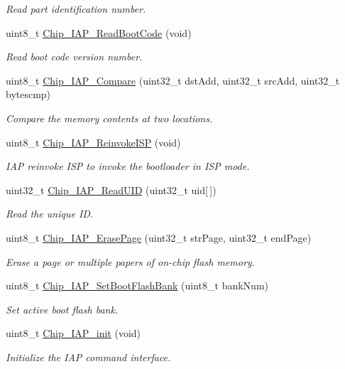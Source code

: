 \begin{DoxyCompactItemize}
\begin{DoxyCompactList}\small\item\em Read part identification number. \end{DoxyCompactList}\item 
uint8\+\_\+t \hyperlink{group___i_a_p__18_x_x__43_x_x_ga478acfa6d97211d4f43edfa8717dc066}{Chip\+\_\+\+I\+A\+P\+\_\+\+Read\+Boot\+Code} (void)
\begin{DoxyCompactList}\small\item\em Read boot code version number. \end{DoxyCompactList}\item 
uint8\+\_\+t \hyperlink{group___i_a_p__18_x_x__43_x_x_ga0f3983319210f99d1931f1e9fa762d9e}{Chip\+\_\+\+I\+A\+P\+\_\+\+Compare} (uint32\+\_\+t dst\+Add, uint32\+\_\+t src\+Add, uint32\+\_\+t bytescmp)
\begin{DoxyCompactList}\small\item\em Compare the memory contents at two locations. \end{DoxyCompactList}\item 
uint8\+\_\+t \hyperlink{group___i_a_p__18_x_x__43_x_x_ga91a6ef5cac3a052f637cf0b5d7d31d53}{Chip\+\_\+\+I\+A\+P\+\_\+\+Reinvoke\+I\+SP} (void)
\begin{DoxyCompactList}\small\item\em I\+AP reinvoke I\+SP to invoke the bootloader in I\+SP mode. \end{DoxyCompactList}\item 
uint32\+\_\+t \hyperlink{group___i_a_p__18_x_x__43_x_x_ga621dd1ce1454b282dcbe56fb905ce4cb}{Chip\+\_\+\+I\+A\+P\+\_\+\+Read\+U\+ID} (uint32\+\_\+t uid\mbox{[}$\,$\mbox{]})
\begin{DoxyCompactList}\small\item\em Read the unique ID. \end{DoxyCompactList}\item 
uint8\+\_\+t \hyperlink{group___i_a_p__18_x_x__43_x_x_ga95ca28fb39884184657054e134671f95}{Chip\+\_\+\+I\+A\+P\+\_\+\+Erase\+Page} (uint32\+\_\+t str\+Page, uint32\+\_\+t end\+Page)
\begin{DoxyCompactList}\small\item\em Erase a page or multiple papers of on-\/chip flash memory. \end{DoxyCompactList}\item 
uint8\+\_\+t \hyperlink{group___i_a_p__18_x_x__43_x_x_gaf9243a47cda7cb70590fb4be5b8ad7e1}{Chip\+\_\+\+I\+A\+P\+\_\+\+Set\+Boot\+Flash\+Bank} (uint8\+\_\+t bank\+Num)
\begin{DoxyCompactList}\small\item\em Set active boot flash bank. \end{DoxyCompactList}\item 
uint8\+\_\+t \hyperlink{group___i_a_p__18_x_x__43_x_x_ga60555d518a6e4dd5c2555c4083f0bb2f}{Chip\+\_\+\+I\+A\+P\+\_\+init} (void)
\begin{DoxyCompactList}\small\item\em Initialize the I\+AP command interface. \end{DoxyCompactList}\end{DoxyCompactItemize}


